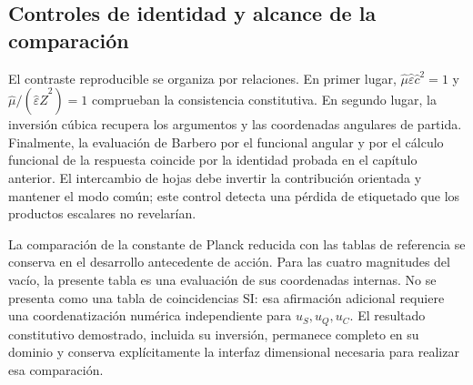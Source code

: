 \subsection{Controles de identidad y alcance de la comparación}

El contraste reproducible se organiza por relaciones. En primer lugar,
$\widehat\mu\widehat\varepsilon\widehat c^2=1$ y
$\widehat\mu/(\widehat\varepsilon\widehat Z^2)=1$ comprueban la
consistencia constitutiva. En segundo lugar, la inversión cúbica recupera
los argumentos y las coordenadas angulares de partida. Finalmente, la
evaluación de Barbero por el funcional angular y por el cálculo funcional
de la respuesta coincide por la identidad probada en el capítulo anterior.
El intercambio de hojas debe invertir la contribución orientada y mantener
el modo común; este control detecta una pérdida de etiquetado que los
productos escalares no revelarían.

La comparación de la constante de Planck reducida con las tablas de
referencia se conserva en el desarrollo antecedente de acción. Para las
cuatro magnitudes del vacío, la presente tabla es una evaluación de sus
coordenadas internas. No se presenta como una tabla de coincidencias SI:
esa afirmación adicional requiere una coordenatización numérica independiente para
$u_S,u_Q,u_C$. El resultado constitutivo demostrado, incluida su inversión,
permanece completo en su dominio y conserva explícitamente la interfaz
dimensional necesaria para realizar esa comparación.
